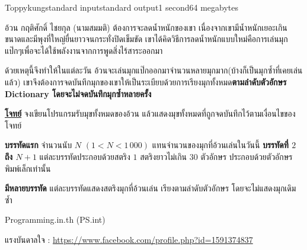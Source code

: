 \documentclass[11pt,a4paper]{article}
\begin{document}
\begin{problem}{Toppykung}{standard input}{standard output}{1 second}{64 megabytes}

  อ้วน กฤติศักดิ์ ไชยกุล (นามสมมติ) ต้องการจะลดน้ำหนักของเขา เนื่องจากเขามีน้ำหนักเยอะเกินขนาดและมีพุงที่ใหญ่ยื่นยาวจนกระทั่งปิดเข็มขัด เขาได้คิดวิธีการลดน้ำหนักแบบใหม่คือการเล่นมุกแป๊กๆเพื่อจะได้ใช้พลังงานจากการพูดสิ่งไร้สาระออกมา

                ด้วยเหตุนี้จึงทำให้ในแต่ละวัน อ้วนจะเล่นมุกแป๊กออกมาจำนวนหลายมุกมาก(บ้างก็เป็นมุกซ้ำที่เคยเล่นแล้ว) เขาจึงต้องการจดบันทึกมุกของเขาให้เป็นระเบียบด้วยการเรียงมุกทั้งหมด\textbf{ตามลำดับตัวอักษร Dictionary โดยจะไม่จดบันทึกมุกซ้ำหลายครั้ง}

\underline{\textbf{โจทย์}} จงเขียนโปรแกรมรับมุขทั้งหมดของอ้วน แล้วแสดงมุขทั้งหมดที่ถูกจดบันทึกไว้ตามเงื่อนไขของโจทย์

\InputFile
\textbf{บรรทัดแรก} จำนวนนับ $N$ $( 1 < N < 1\,000 )$ แทนจำนวนของมุกที่อ้วนเล่นในวันนี้
\textbf{บรรทัดที่ $2$ ถึง $N+1$} แต่ละบรรทัดประกอบด้วยสตริง $1$ สตริงยาวไม่เกิน $30$ ตัวอักษร ประกอบด้วยตัวอักษรพิมพ์เล็กเท่านั้น

\OutputFile

\textbf{มีหลายบรรทัด} แต่ละบรรทัดแสดงสตริงมุกที่อ้วนเล่น เรียงตามลำดับตัวอักษร โดยจะไม่แสดงมุกเดิมซ้ำ

\Examples

\begin{example}
%
%
%
\end{example}


\Source

Programming.in.th (PS.int)

แรงบันดาลใจ : \href{https://www.facebook.com/profile.php?id=1591374837}{https://www.facebook.com/profile.php?id=1591374837}

\end{problem}
\end{document}
